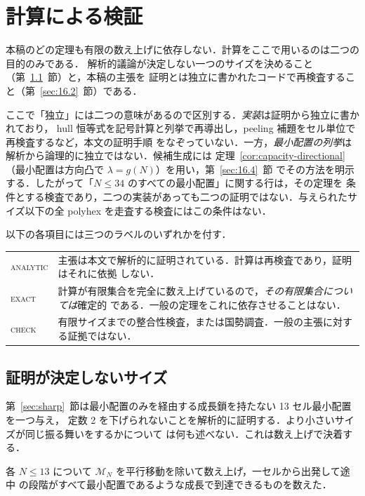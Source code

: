 \documentclass[11pt]{article}
\theoremstyle{plain}
\theoremstyle{definition}
\theoremstyle{remark}
\begin{document}
\section{計算による検証}\label{sec:computation}

本稿のどの定理も有限の数え上げに依存しない．計算をここで用いるのは二つの目的のみである．
解析的議論が決定しない一つのサイズを決めること（第~\ref{sec:16.1}~節）と，本稿の主張を
証明とは独立に書かれたコードで再検査すること（第~\ref{sec:16.2}~節）である．

ここで「独立」には二つの意味があるので区別する．\emph{実装}は証明から独立に書かれており，
hull 恒等式を記号計算と列挙で再導出し，peeling 補題をセル単位で再検査するなど，本文の証明手順
をなぞっていない．一方，\emph{最小配置の列挙}は解析から論理的に独立ではない．候補生成には
定理~\ref{cor:capacity-directional}（最小配置は方向凸で \(\lambda=g(N)\)）を用い，第~\ref{sec:16.4}~節
でその方法を明示する．したがって「\(N\le34\) のすべての最小配置」に関する行は，その定理を
条件とする検査であり，二つの実装があっても二つの証明ではない．与えられたサイズ以下の全 polyhex
を走査する検査にはこの条件はない．

以下の各項目には三つのラベルのいずれかを付す．

\begin{center}
\begin{tabularx}{\linewidth}{@{}l>{\raggedright\arraybackslash}X@{}}
\toprule
\textsc{analytic} & 主張は本文で解析的に証明されている．計算は再検査であり，証明はそれに依拠
しない． \\
\textsc{exact} & 計算が有限集合を完全に数え上げているので，\emph{その有限集合については}確定的
である．一般の定理をこれに依存させることはない． \\
\textsc{check} & 有限サイズまでの整合性検査，または国勢調査．一般の主張に対する証拠ではない． \\
\bottomrule
\end{tabularx}
\end{center}

\subsection{証明が決定しないサイズ}\label{sec:16.1}

第~\ref{sec:sharp}~節は最小配置のみを経由する成長鎖を持たない 13 セル最小配置を一つ与え，
定数 2 を下げられないことを解析的に証明する．より小さいサイズが同じ振る舞いをするかについて
は何も述べない．これは数え上げで決着する．

各 \(N\le13\) について \(\mathcal{M}_{N}\) を平行移動を除いて数え上げ，一セルから出発して途中
の段階がすべて最小配置であるような成長で到達できるものを数えた．
\end{document}
